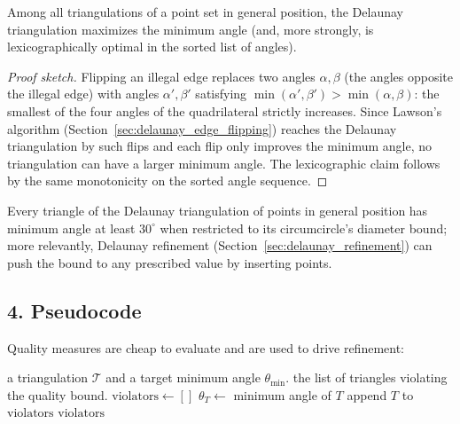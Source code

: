\begin{theorem}\label{thm:maximin}
Among all triangulations of a point set in general position, the Delaunay
triangulation maximizes the minimum angle (and, more strongly, is
lexicographically optimal in the sorted list of angles).
\end{theorem}

\begin{proof}[Proof sketch]
Flipping an illegal edge replaces two angles $\alpha, \beta$ (the angles
opposite the illegal edge) with angles $\alpha', \beta'$ satisfying
$\min(\alpha',\beta') > \min(\alpha,\beta)$: the smallest of the four angles of
the quadrilateral strictly increases. Since Lawson's algorithm
(Section~\ref{sec:delaunay_edge_flipping}) reaches the Delaunay triangulation
by such flips and each flip only improves the minimum angle, no triangulation
can have a larger minimum angle. The lexicographic claim follows by the same
monotonicity on the sorted angle sequence.
\end{proof}

\begin{corollary}\label{cor:angle_bound}
Every triangle of the Delaunay triangulation of points in general position has
minimum angle at least $30^\circ$ when restricted to its circumcircle's
diameter bound; more relevantly, Delaunay refinement
(Section~\ref{sec:delaunay_refinement}) can push the bound to any prescribed
value by inserting points.
\end{corollary}

\subsection{4. Pseudocode}

Quality measures are cheap to evaluate and are used to drive refinement:

\begin{algorithm}[htbp]
\caption{Quality Report}
\label{alg:quality_report}
\begin{algorithmic}[1]
\Require a triangulation $\mathcal{T}$ and a target minimum angle $\theta_{\min}$.
\Ensure the list of triangles violating the quality bound.
  \State $\text{violators} \gets []$
    \State $\theta_T \gets $ minimum angle of $T$
      \State append $T$ to $\text{violators}$
    \EndIf
  \EndFor
  \State \Return $\text{violators}$
\EndFunction
\end{algorithmic}
\end{algorithm}

